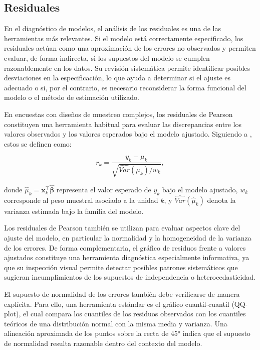\documentclass[
  spanish,
  12pt,
]{book}
\begin{document}
\subsection{Residuales}\label{residuales}

En el diagnóstico de modelos, el análisis de los residuales es una de las herramientas más relevantes. Si el modelo está correctamente especificado, los residuales actúan como una aproximación de los errores no observados y permiten evaluar, de forma indirecta, si los supuestos del modelo se cumplen razonablemente en los datos. Su revisión sistemática permite identificar posibles desviaciones en la especificación, lo que ayuda a determinar si el ajuste es adecuado o si, por el contrario, es necesario reconsiderar la forma funcional del modelo o el método de estimación utilizado.

En encuestas con diseños de muestreo complejos, los residuales de Pearson constituyen una herramienta habitual para evaluar las discrepancias entre los valores observados y los valores esperados bajo el modelo ajustado. Siguiendo a \citet{heeringa2017applied}, estos se definen como:

\[
r_{k} = \frac{y_k - \mu_k}{\sqrt{\widehat{Var}(\mu_k)/w_k}},
\]

donde \(\hat{\mu}_{k} = \mathbf{x}_{k}^{\top}\hat{\boldsymbol{\beta}}\) representa el valor esperado de \(y_{k}\) bajo el modelo ajustado, \(w_{k}\) corresponde al peso muestral asociado a la unidad \(k\), y \(\widehat{Var}(\hat{\mu}_{k})\) denota la varianza estimada bajo la familia del modelo.

Los residuales de Pearson también se utilizan para evaluar aspectos clave del ajuste del modelo, en particular la normalidad y la homogeneidad de la varianza de los errores. De forma complementaria, el gráfico de residuos frente a valores ajustados constituye una herramienta diagnóstica especialmente informativa, ya que su inspección visual permite detectar posibles patrones sistemáticos que sugieran incumplimientos de los supuestos de independencia o heterocedasticidad.

El supuesto de normalidad de los errores también debe verificarse de manera explícita. Para ello, una herramienta estándar es el gráfico cuantil-cuantil (QQ-plot), el cual compara los cuantiles de los residuos observados con los cuantiles teóricos de una distribución normal con la misma media y varianza. Una alineación aproximada de los puntos sobre la recta de 45° indica que el supuesto de normalidad resulta razonable dentro del contexto del modelo.
\end{document}
